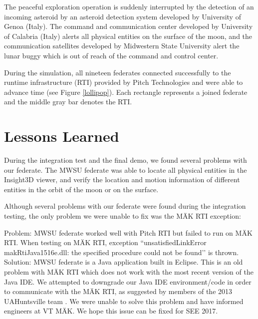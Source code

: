 \documentclass[journal, onecolumn]{IEEEtran}
\begin{document}
The peaceful exploration operation is suddenly interrupted by the detection of an incoming asteroid by an asteroid detection system developed by University of Genoa (Italy). The command and communication center \cite{falcone2014simulation} developed by University of Calabria (Italy) alerts all physical entities on the surface of the moon, and the communication satellites developed by Midwestern State University alert the lunar buggy which is out of reach of the command and control center.

During the simulation, all nineteen federates connected successfully to the runtime infrastructure (RTI) provided by Pitch Technologies and were able to advance time (see Figure \ref{lollipop}). Each rectangle represents a joined federate and the middle gray bar denotes the RTI.

\section{Lessons Learned}
During the integration test and the final demo, we found several problems with our federate.  The MWSU federate was able to locate all physical entities in the Insight3D viewer, and verify the location and motion information of different entities in the orbit of the moon or on the surface.  

Although several problems with our federate were found during the integration testing, the only problem we were unable to fix was the M{\"A}K RTI exception:


Problem: MWSU federate worked well with Pitch RTI but failed to run on M{\"A}K RTI. When testing on M{\"A}K RTI, exception ``unsatisfiedLinkError makRtiJava1516e.dll: the specified procedure could not be found\rq\rq{} is thrown.
Solution: MWSU federate is a Java application built in Eclipse. This is an old problem with M{\"A}K RTI which does not work with the most recent version of the Java IDE. We attempted to downgrade our Java IDE environment/code in order to communicate with the M{\"A}K RTI, as suggested by members of the 2013 UAHuntsville team \cite{bulgatz2012design}. We were unable to solve this problem and have informed engineers at VT M{\"A}K. We hope this issue can be fixed for SEE 2017.
\end{document}
